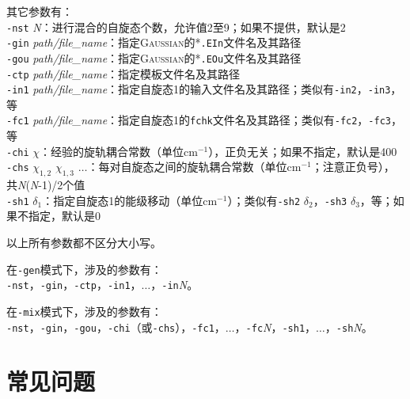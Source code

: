 \documentclass[UTF8]{ctexart}
\begin{document}
\bigskip
其它参数有：  \\
\verb|-nst| \textit{N}：进行混合的自旋态个数，允许值2至9；如果不提供，默认是2 \\
\verb|-gin| \textit{path/file\_name}：指定\textsc{Gaussian}的*\verb|.EIn|文件名及其路径 \\
\verb|-gou| \textit{path/file\_name}：指定\textsc{Gaussian}的*\verb|.EOu|文件名及其路径 \\
\verb|-ctp| \textit{path/file\_name}：指定模板文件名及其路径 \\
\verb|-in1| \textit{path/file\_name}：指定自旋态1的输入文件名及其路径；类似有\verb|-in2|，\verb|-in3|，等 \\
\verb|-fc1| \textit{path/file\_name}：指定自旋态1的\verb|fchk|文件名及其路径；类似有\verb|-fc2|，\verb|-fc3|，等 \\
\verb|-chi| \textit{$\chi$}：经验的旋轨耦合常数（单位cm$^{-1}$），正负无关；如果不指定，默认是400 \\
\verb|-chs| \textit{$\chi_{1,2}$ $\chi_{1,3}$ $\ldots$}：每对自旋态之间的旋轨耦合常数（单位cm$^{-1}$；注意正负号），共\textit{N}(\textit{N}-1)/2个值 \\
\verb|-sh1| \textit{$\delta_1$}：指定自旋态1的能级移动（单位cm$^{-1}$）；类似有\verb|-sh2| \textit{$\delta_2$}，\verb|-sh3| \textit{$\delta_3$}，等；如果不指定，默认是0

\bigskip
以上所有参数都不区分大小写。

\bigskip
在\verb|-gen|模式下，涉及的参数有：\\
\verb|-nst|，\verb|-gin|，\verb|-ctp|，\verb|-in1|，$\ldots$，\verb|-in|\textit{N}。

\bigskip
在\verb|-mix|模式下，涉及的参数有：\\
\verb|-nst|，\verb|-gin|，\verb|-gou|，\verb|-chi|（或\verb|-chs|），\verb|-fc1|，$\ldots$，\verb|-fc|\textit{N}，\verb|-sh1|，$\ldots$，\verb|-sh|\textit{N}。


\newpage

\section{常见问题}
\end{document}

